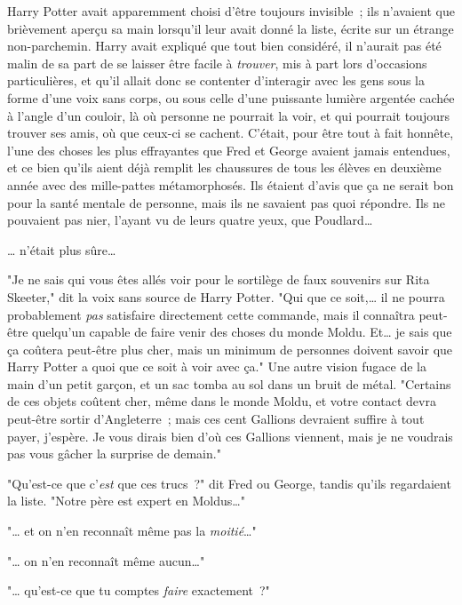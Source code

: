 \later

Harry Potter avait apparemment choisi d'être toujours invisible~; ils n'avaient que brièvement aperçu sa main lorsqu'il leur avait donné la liste, écrite sur un étrange non-parchemin. Harry avait expliqué que tout bien considéré, il n'aurait pas été malin de sa part de se laisser être facile à \emph{trouver}, mis à part lors d'occasions particulières, et qu'il allait donc se contenter d'interagir avec les gens sous la forme d'une voix sans corps, ou sous celle d'une puissante lumière argentée cachée à l'angle d'un couloir, là où personne ne pourrait la voir, et qui pourrait toujours trouver ses amis, où que ceux-ci se cachent. C'était, pour être tout à fait honnête, l'une des choses les plus effrayantes que Fred et George avaient jamais entendues, et ce bien qu'ils aient déjà remplit les chaussures de tous les élèves en deuxième année avec des mille-pattes métamorphosés. Ils étaient d'avis que ça ne serait bon pour la santé mentale de personne, mais ils ne savaient pas quoi répondre. Ils ne pouvaient pas nier, l'ayant vu de leurs quatre yeux, que Poudlard…

… n'était plus sûre…

"Je ne sais qui vous êtes allés voir pour le sortilège de faux souvenirs sur Rita Skeeter," dit la voix sans source de Harry Potter. "Qui que ce soit,… il ne pourra probablement \emph{pas} satisfaire directement cette commande, mais il connaîtra peut-être quelqu'un capable de faire venir des choses du monde Moldu. Et… je sais que ça coûtera peut-être plus cher, mais un minimum de personnes doivent savoir que Harry Potter a quoi que ce soit à voir avec ça." Une autre vision fugace de la main d'un petit garçon, et un sac tomba au sol dans un bruit de métal. "Certains de ces objets coûtent cher, même dans le monde Moldu, et votre contact devra peut-être sortir d'Angleterre~; mais ces cent Gallions devraient suffire à tout payer, j'espère. Je vous dirais bien d'où ces Gallions viennent, mais je ne voudrais pas vous gâcher la surprise de demain."

"Qu'est-ce que c'\emph{est} que ces trucs~?" dit Fred ou George, tandis qu'ils regardaient la liste. "Notre père est expert en Moldus…"

"… et on n'en reconnaît même pas la \emph{moitié}…"

"… on n'en reconnaît même aucun…"

"… qu'est-ce que tu comptes \emph{faire} exactement~?"

